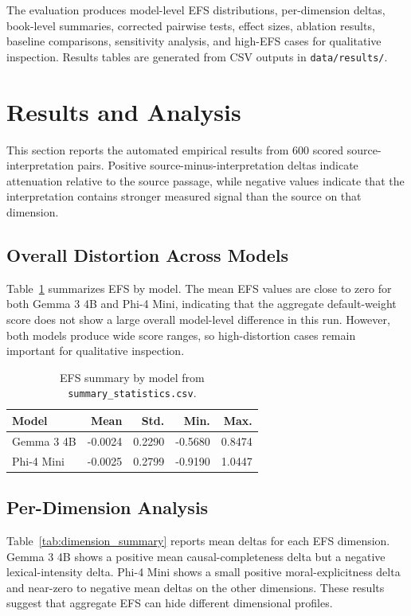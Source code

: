 \documentclass[10pt, conference]{IEEEtran}
\begin{document}
The evaluation produces model-level EFS distributions, per-dimension deltas, book-level summaries, corrected pairwise tests, effect sizes, ablation results, baseline comparisons, sensitivity analysis, and high-EFS cases for qualitative inspection. Results tables are generated from CSV outputs in \texttt{data/results/}.

\section{Results and Analysis} \label{Results}

This section reports the automated empirical results from 600 scored source-interpretation pairs. Positive source-minus-interpretation deltas indicate attenuation relative to the source passage, while negative values indicate that the interpretation contains stronger measured signal than the source on that dimension.

\subsection{Overall Distortion Across Models}

Table~\ref{tab:efs_summary} summarizes EFS by model. The mean EFS values are close to zero for both Gemma 3 4B and Phi-4 Mini, indicating that the aggregate default-weight score does not show a large overall model-level difference in this run. However, both models produce wide score ranges, so high-distortion cases remain important for qualitative inspection.

\begin{table}[h]
\centering
\caption{EFS summary by model from \texttt{summary\_statistics.csv}.}
\label{tab:efs_summary}
\scriptsize
\begin{tabular}{lrrrr}
\toprule
\textbf{Model} & \textbf{Mean} & \textbf{Std.} & \textbf{Min.} & \textbf{Max.} \\
\midrule
Gemma 3 4B & -0.0024 & 0.2290 & -0.5680 & 0.8474 \\
Phi-4 Mini & -0.0025 & 0.2799 & -0.9190 & 1.0447 \\
\bottomrule
\end{tabular}
\end{table}

\subsection{Per-Dimension Analysis}

Table~\ref{tab:dimension_summary} reports mean deltas for each EFS dimension. Gemma 3 4B shows a positive mean causal-completeness delta but a negative lexical-intensity delta. Phi-4 Mini shows a small positive moral-explicitness delta and near-zero to negative mean deltas on the other dimensions. These results suggest that aggregate EFS can hide different dimensional profiles.
\end{document}
